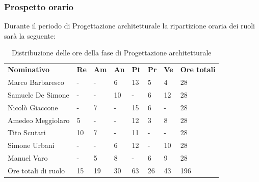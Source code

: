     \subsubsection{Prospetto orario}
    Durante il periodo di Progettazione architetturale la ripartizione oraria dei ruoli sarà la seguente:
        \begin{center}
            \begin{table}[ht!]
                \centering
                \caption{Distribuzione delle ore della fase di Progettazione architetturale}
                \vspace{5px}
                \renewcommand{\arraystretch}{1.8}
                \begin{tabular}{p{100px} p{20px} p{20px} p{20px} p{20px} p{20px} p{20px} p{50px} }
                    \rowcolor{logo!70} \textbf{Nominativo} & \textbf{Re} & \textbf{Am} & \textbf{An} & \textbf{Pt} & \textbf{Pr} & \textbf{Ve} & \textbf{Ore totali}\\
                    Marco Barbaresco & - & - & 6 & 13 & 5 & 4 & 28\\
                    Samuele De Simone & - & - & 10 & - & 6 & 12 & 28\\
                    Nicolò Giaccone & - & 7 & - & 15 & 6 & - & 28\\
                    Amedeo Meggiolaro & 5 & - & - & 12 & 3 & 8 & 28\\
                    Tito Scutari & 10 & 7 & - & 11 & - & - & 28\\
                    Simone Urbani & - & - & 6 & 12 & - & 10 & 28\\
                    Manuel Varo & - & 5 & 8 & - & 6 & 9 & 28\\
                    Ore totali di ruolo & 15 & 19 & 30 & 63 & 26 & 43 & 196\\
                \end{tabular}
            \end{table}
        \end{center}
        \pagebreak
        
